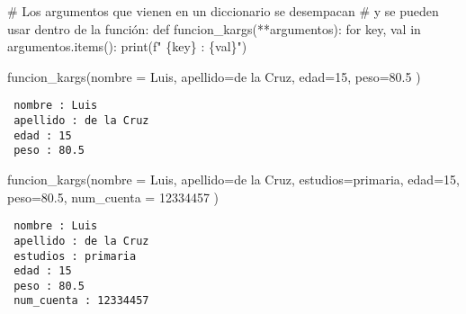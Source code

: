\documentclass[
  letterpaper,
  DIV=11,
  numbers=noendperiod]{scrreprt}
\newenvironment{Shaded}{\begin{snugshade}}{\end{snugshade}}
\newcommand{\BuiltInTok}[1]{\textcolor[rgb]{0.00,0.23,0.31}{#1}}
\newcommand{\CommentTok}[1]{\textcolor[rgb]{0.37,0.37,0.37}{#1}}
\newcommand{\ControlFlowTok}[1]{\textcolor[rgb]{0.00,0.23,0.31}{#1}}
\newcommand{\DecValTok}[1]{\textcolor[rgb]{0.68,0.00,0.00}{#1}}
\newcommand{\FloatTok}[1]{\textcolor[rgb]{0.68,0.00,0.00}{#1}}
\newcommand{\KeywordTok}[1]{\textcolor[rgb]{0.00,0.23,0.31}{#1}}
\newcommand{\NormalTok}[1]{\textcolor[rgb]{0.00,0.23,0.31}{#1}}
\newcommand{\OperatorTok}[1]{\textcolor[rgb]{0.37,0.37,0.37}{#1}}
\newcommand{\SpecialCharTok}[1]{\textcolor[rgb]{0.37,0.37,0.37}{#1}}
\newcommand{\SpecialStringTok}[1]{\textcolor[rgb]{0.13,0.47,0.30}{#1}}
\newcommand{\StringTok}[1]{\textcolor[rgb]{0.13,0.47,0.30}{#1}}
\begin{document}
\begin{Shaded}
\begin{Highlighting}[]
\CommentTok{\# Los argumentos que vienen en un diccionario se desempacan}
\CommentTok{\#  y se pueden usar dentro de la función:}
\KeywordTok{def}\NormalTok{ funcion\_kargs(}\OperatorTok{**}\NormalTok{argumentos):}
    \ControlFlowTok{for}\NormalTok{ key, val }\KeywordTok{in}\NormalTok{ argumentos.items():}
        \BuiltInTok{print}\NormalTok{(}\SpecialStringTok{f" }\SpecialCharTok{\{}\NormalTok{key}\SpecialCharTok{\}}\SpecialStringTok{ : }\SpecialCharTok{\{}\NormalTok{val}\SpecialCharTok{\}}\SpecialStringTok{"}\NormalTok{)}
\end{Highlighting}
\end{Shaded}

\begin{Shaded}
\begin{Highlighting}[]
\NormalTok{funcion\_kargs(nombre }\OperatorTok{=} \StringTok{\textquotesingle{}Luis\textquotesingle{}}\NormalTok{, apellido}\OperatorTok{=}\StringTok{\textquotesingle{}de la Cruz\textquotesingle{}}\NormalTok{, edad}\OperatorTok{=}\DecValTok{15}\NormalTok{, peso}\OperatorTok{=}\FloatTok{80.5}\NormalTok{ )}
\end{Highlighting}
\end{Shaded}

\begin{verbatim}
 nombre : Luis
 apellido : de la Cruz
 edad : 15
 peso : 80.5
\end{verbatim}

\begin{Shaded}
\begin{Highlighting}[]
\NormalTok{funcion\_kargs(nombre }\OperatorTok{=} \StringTok{\textquotesingle{}Luis\textquotesingle{}}\NormalTok{, apellido}\OperatorTok{=}\StringTok{\textquotesingle{}de la Cruz\textquotesingle{}}\NormalTok{, estudios}\OperatorTok{=}\StringTok{\textquotesingle{}primaria\textquotesingle{}}\NormalTok{, edad}\OperatorTok{=}\DecValTok{15}\NormalTok{, peso}\OperatorTok{=}\FloatTok{80.5}\NormalTok{, num\_cuenta }\OperatorTok{=} \DecValTok{12334457}\NormalTok{ )}
\end{Highlighting}
\end{Shaded}

\begin{verbatim}
 nombre : Luis
 apellido : de la Cruz
 estudios : primaria
 edad : 15
 peso : 80.5
 num_cuenta : 12334457
\end{verbatim}
\end{document}
